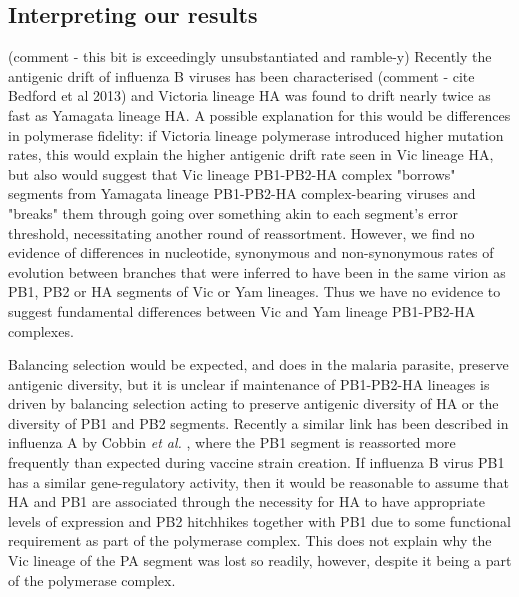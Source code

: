 \documentclass[11pt,oneside,letterpaper]{article}
\begin{document}
\subsection*{Interpreting our results}
(comment - this bit is exceedingly unsubstantiated and ramble-y)
Recently the antigenic drift of influenza B viruses has been characterised (comment - cite Bedford et al 2013) and Victoria lineage HA was found to drift nearly twice as fast as Yamagata lineage HA.
A possible explanation for this would be differences in polymerase fidelity: if Victoria lineage polymerase introduced higher mutation rates, this would explain the higher antigenic drift rate seen in Vic lineage HA, but also would suggest that Vic lineage PB1-PB2-HA complex "borrows" segments from Yamagata lineage PB1-PB2-HA complex-bearing viruses and "breaks" them through going over something akin to each segment's error threshold, necessitating another round of reassortment.
However, we find no evidence of differences in nucleotide, synonymous and non-synonymous rates of evolution between branches that were inferred to have been in the same virion as PB1, PB2 or HA segments of Vic or Yam lineages.
Thus we have no evidence to suggest fundamental differences between Vic and Yam lineage PB1-PB2-HA complexes.

Balancing selection would be expected, and does in the malaria parasite, preserve antigenic diversity, but it is unclear if maintenance of PB1-PB2-HA lineages is driven by balancing selection acting to preserve antigenic diversity of HA or the diversity of PB1 and PB2 segments.
Recently a similar link has been described in influenza A by Cobbin \textit{et al.} \cite{cobbin2013}, where the PB1 segment is reassorted more frequently than expected during vaccine strain creation.
If influenza B virus PB1 has a similar gene-regulatory activity, then it would be reasonable to assume that HA and PB1 are associated through the necessity for HA to have appropriate levels of expression and PB2 hitchhikes together with PB1 due to some functional requirement as part of the polymerase complex.
This does not explain why the Vic lineage of the PA segment was lost so readily, however, despite it being a part of the polymerase complex.
\end{document}
